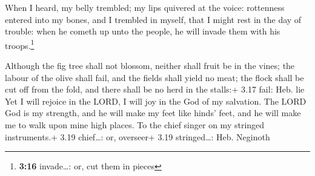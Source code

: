  When I heard, my belly trembled; my lips quivered at the
voice: rottenness entered into my bones, and I trembled in myself, that
I might rest in the day of trouble: when he cometh up unto the people,
he will invade them with his troops.\footnote{\textbf{3:16}
  invade\ldots: or, cut them in pieces}

 Although the fig tree shall not blossom, neither shall
fruit be in the vines; the labour of the olive shall fail, and the
fields shall yield no meat; the flock shall be cut off from the fold,
and there shall be no herd in the stalls:+ 3.17 fail: Heb. lie
 Yet I will rejoice in the LORD, I will joy in the God of
my salvation.  The LORD God is my strength, and he will
make my feet like hinds' feet, and he will make me to walk upon mine
high places. To the chief singer on my stringed instruments.+ 3.19
chief\ldots: or, overseer+ 3.19 stringed\ldots: Heb. Neginoth
